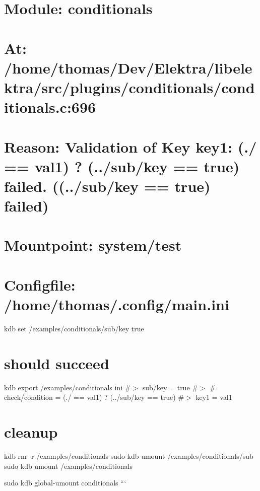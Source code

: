 \section*{Module\+: conditionals}

\section*{At\+: /home/thomas/\+Dev/\+Elektra/libelektra/src/plugins/conditionals/conditionals.c\+:696}

\section*{Reason\+: Validation of Key key1\+: (./ == \textquotesingle{}val1\textquotesingle{}) ? (../sub/key == \textquotesingle{}true\textquotesingle{}) failed. ((../sub/key == \textquotesingle{}true\textquotesingle{}) failed)}

\section*{Mountpoint\+: system/test}

\section*{Configfile\+: /home/thomas/.config/main.\+ini}

kdb set /examples/conditionals/sub/key true

\section*{should succeed}

kdb export /examples/conditionals ini \#$>$ sub/key = true \#$>$ \# check/condition = (./ == \textquotesingle{}val1\textquotesingle{}) ? (../sub/key == \textquotesingle{}true\textquotesingle{}) \#$>$ key1 = val1

\section*{cleanup}

kdb rm -\/r /examples/conditionals sudo kdb umount /examples/conditionals/sub sudo kdb umount /examples/conditionals

sudo kdb global-\/umount conditionals ``` 